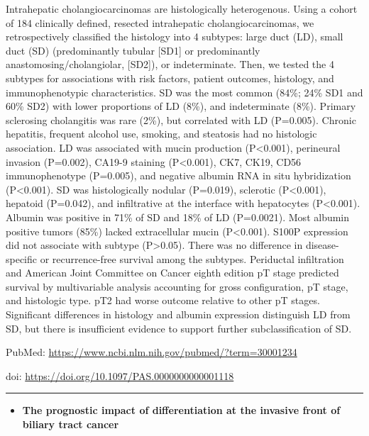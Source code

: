 \documentclass[]{article}
\providecommand{\tightlist}{%
  \setlength{\itemsep}{0pt}\setlength{\parskip}{0pt}}
\begin{document}
Intrahepatic cholangiocarcinomas are histologically heterogenous. Using
a cohort of 184 clinically defined, resected intrahepatic
cholangiocarcinomas, we retrospectively classified the histology into 4
subtypes: large duct (LD), small duct (SD) (predominantly tubular
{[}SD1{]} or predominantly anastomosing/cholangiolar, {[}SD2{]}), or
indeterminate. Then, we tested the 4 subtypes for associations with risk
factors, patient outcomes, histology, and immunophenotypic
characteristics. SD was the most common (84\%; 24\% SD1 and 60\% SD2)
with lower proportions of LD (8\%), and indeterminate (8\%). Primary
sclerosing cholangitis was rare (2\%), but correlated with LD (P=0.005).
Chronic hepatitis, frequent alcohol use, smoking, and steatosis had no
histologic association. LD was associated with mucin production
(P\textless{}0.001), perineural invasion (P=0.002), CA19-9 staining
(P\textless{}0.001), CK7, CK19, CD56 immunophenotype (P=0.005), and
negative albumin RNA in situ hybridization (P\textless{}0.001). SD was
histologically nodular (P=0.019), sclerotic (P\textless{}0.001),
hepatoid (P=0.042), and infiltrative at the interface with hepatocytes
(P\textless{}0.001). Albumin was positive in 71\% of SD and 18\% of LD
(P=0.0021). Most albumin positive tumors (85\%) lacked extracellular
mucin (P\textless{}0.001). S100P expression did not associate with
subtype (P\textgreater{}0.05). There was no difference in
disease-specific or recurrence-free survival among the subtypes.
Periductal infiltration and American Joint Committee on Cancer eighth
edition pT stage predicted survival by multivariable analysis accounting
for gross configuration, pT stage, and histologic type. pT2 had worse
outcome relative to other pT stages. Significant differences in
histology and albumin expression distinguish LD from SD, but there is
insufficient evidence to support further subclassification of SD.

PubMed: \url{https://www.ncbi.nlm.nih.gov/pubmed/?term=30001234}

doi: \url{https://doi.org/10.1097/PAS.0000000000001118}

{}

{}

\begin{center}\rule{0.5\linewidth}{\linethickness}\end{center}

\begin{itemize}
\tightlist
\item
  \textbf{The prognostic impact of differentiation at the invasive front
  of biliary tract cancer}
\end{itemize}
\end{document}
